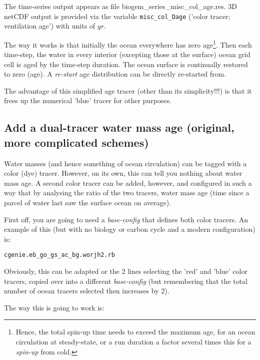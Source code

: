 \documentclass[11pt,fleqn]{book} %
\begin{document}
The time-series output appears as file \textsf{\footnotesize biogem\_series\_misc\_col\_age.res}. 3D netCDF output is provided via the variable \texttt{misc\_col\_Dage} ('color tracer; ventilation age') with units of \(yr\).

The way it works is that initially the ocean everywhere has zero age\footnote{Hence, the total spin-up time needs to exceed the maximum age, for an ocean circulation at steady-state, or a run duration a factor several times this for a \textit{spin-up} from cold.}. Then each time-step, the water in every interior (excepting those at the surface) ocean grid cell is aged by the time-step duration. The ocean surface is continually restored to zero (age). A \textit{re-start} age distribution can be directly re-started from.

The advantage of this simplified age tracer (other than its simplicity!!!) is that it frees up the numerical 'blue' tracer for other purposes.

%
\subsection*{Add a dual-tracer water mass age  (original, more complicated schemes)}
\vspace{1mm}

Water masses (and hence something of ocean circulation) can be tagged with a color (dye) tracer. However, on its own, this can tell you nothing about water mass age. A second color tracer can be added, however, and configured in such a way that by analysing the ratio of the two tracers, water mass age (time since a parcel of water last saw the surface ocean on average).

First off, you are going to need a \textit{base-config} that defines both color tracers. An example of this (but with no biology or carbon cycle and a modern configuration) is:
\vspace{-2pt}\begin{verbatim}
cgenie.eb_go_gs_ac_bg.worjh2.rb
\end{verbatim}\vspace{-2pt}
Obviously, this can be adapted or the 2 lines selecting the 'red' and 'blue' color tracers, copied over into a different \textit{base-config} (but remembering that the total number of ocean tracers selected then increases by 2).

The way this is going to work is:
\end{document}
